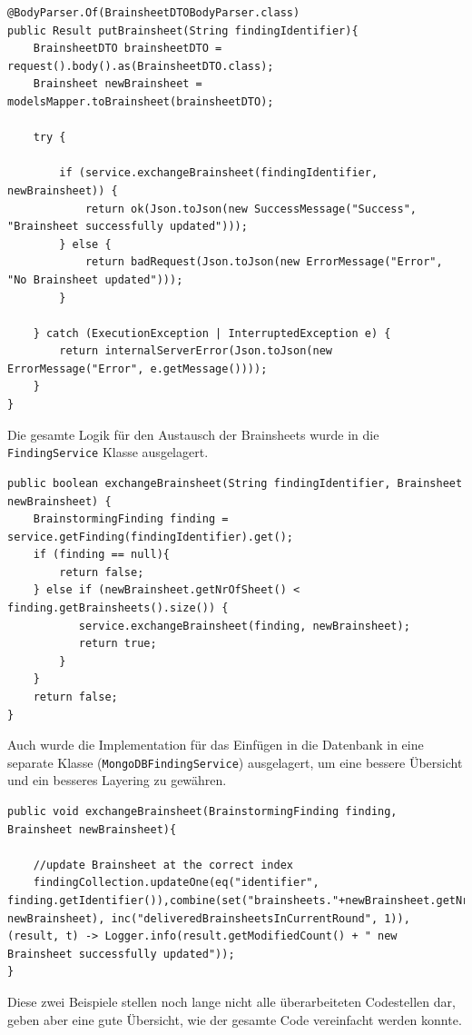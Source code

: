 \begin{lstlisting}[caption={PutBrainsheet nach Refactoring}, label=putBrainsheetNachRef]
@BodyParser.Of(BrainsheetDTOBodyParser.class)
public Result putBrainsheet(String findingIdentifier){
    BrainsheetDTO brainsheetDTO = request().body().as(BrainsheetDTO.class);
    Brainsheet newBrainsheet = modelsMapper.toBrainsheet(brainsheetDTO);

    try {

        if (service.exchangeBrainsheet(findingIdentifier, newBrainsheet)) {
            return ok(Json.toJson(new SuccessMessage("Success", "Brainsheet successfully updated")));
        } else {
            return badRequest(Json.toJson(new ErrorMessage("Error", "No Brainsheet updated")));
        }

    } catch (ExecutionException | InterruptedException e) {
        return internalServerError(Json.toJson(new ErrorMessage("Error", e.getMessage())));
    }
}
\end{lstlisting}

Die gesamte Logik für den Austausch der Brainsheets wurde in die \texttt{FindingService} Klasse ausgelagert.

\begin{lstlisting}[caption={Exchange Brainsheet im Business Layer}, label=exchangeBrainsheetBusinessLayer]
public boolean exchangeBrainsheet(String findingIdentifier, Brainsheet newBrainsheet) {
	BrainstormingFinding finding = service.getFinding(findingIdentifier).get();
	if (finding == null){
	    return false;
	} else if (newBrainsheet.getNrOfSheet() < finding.getBrainsheets().size()) {
	       service.exchangeBrainsheet(finding, newBrainsheet);
	       return true;
	    }
	}
	return false;
}
\end{lstlisting}

Auch wurde die Implementation für das Einfügen in die Datenbank in eine separate Klasse (\texttt{MongoDBFindingService}) ausgelagert, um eine bessere Übersicht und ein besseres Layering zu gewähren.

\begin{lstlisting}[caption={Exchange Brainsheet im Data Access Layer}, label=exchangeBrainsheetDAL]
public void exchangeBrainsheet(BrainstormingFinding finding, Brainsheet newBrainsheet){
    
	//update Brainsheet at the correct index
	findingCollection.updateOne(eq("identifier", finding.getIdentifier()),combine(set("brainsheets."+newBrainsheet.getNrOfSheet(), newBrainsheet), inc("deliveredBrainsheetsInCurrentRound", 1)), (result, t) -> Logger.info(result.getModifiedCount() + " new Brainsheet successfully updated"));
}
\end{lstlisting}
Diese zwei Beispiele stellen noch lange nicht alle überarbeiteten Codestellen dar, geben aber eine gute Übersicht, wie der gesamte Code vereinfacht werden konnte.


